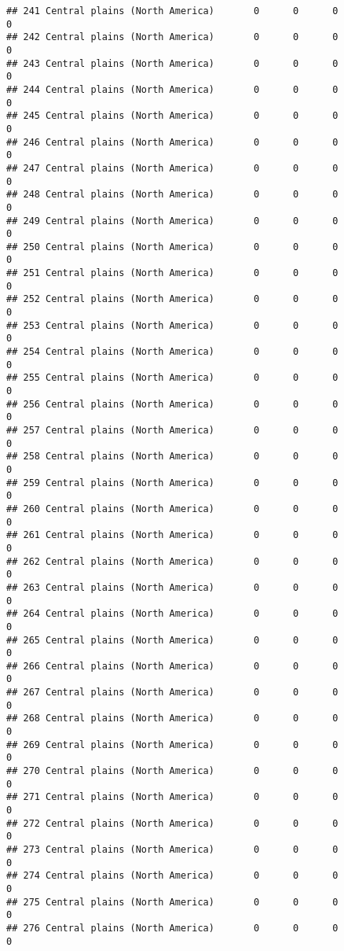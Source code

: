 \documentclass[]{article}
\begin{document}
\begin{verbatim}
## 241 Central plains (North America)       0      0      0             0
## 242 Central plains (North America)       0      0      0             0
## 243 Central plains (North America)       0      0      0             0
## 244 Central plains (North America)       0      0      0             0
## 245 Central plains (North America)       0      0      0             0
## 246 Central plains (North America)       0      0      0             0
## 247 Central plains (North America)       0      0      0             0
## 248 Central plains (North America)       0      0      0             0
## 249 Central plains (North America)       0      0      0             0
## 250 Central plains (North America)       0      0      0             0
## 251 Central plains (North America)       0      0      0             0
## 252 Central plains (North America)       0      0      0             0
## 253 Central plains (North America)       0      0      0             0
## 254 Central plains (North America)       0      0      0             0
## 255 Central plains (North America)       0      0      0             0
## 256 Central plains (North America)       0      0      0             0
## 257 Central plains (North America)       0      0      0             0
## 258 Central plains (North America)       0      0      0             0
## 259 Central plains (North America)       0      0      0             0
## 260 Central plains (North America)       0      0      0             0
## 261 Central plains (North America)       0      0      0             0
## 262 Central plains (North America)       0      0      0             0
## 263 Central plains (North America)       0      0      0             0
## 264 Central plains (North America)       0      0      0             0
## 265 Central plains (North America)       0      0      0             0
## 266 Central plains (North America)       0      0      0             0
## 267 Central plains (North America)       0      0      0             0
## 268 Central plains (North America)       0      0      0             0
## 269 Central plains (North America)       0      0      0             0
## 270 Central plains (North America)       0      0      0             0
## 271 Central plains (North America)       0      0      0             0
## 272 Central plains (North America)       0      0      0             0
## 273 Central plains (North America)       0      0      0             0
## 274 Central plains (North America)       0      0      0             0
## 275 Central plains (North America)       0      0      0             0
## 276 Central plains (North America)       0      0      0             0

\end{verbatim}
\end{document}
